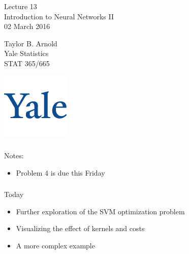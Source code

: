 \documentclass[xetex,mathserif,serif,aspectratio=169]{beamer}
\begin{document}
\begin{frame}[fragile] \frametitle{} \oldB \small

\vfill

{\fontsize{0.7cm}{0cm}\selectfont Lecture 13 \\\vspace{0.2cm} Introduction to Neural Networks II}\\\vspace{0.5cm}
02 March 2016

\vspace{2cm}

\begin{minipage}{0.6\textwidth}
Taylor B. Arnold \\
Yale Statistics \\
STAT 365/665
\end{minipage}
\hfill
\begin{minipage}{0.3\textwidth}\raggedleft
\includegraphics[scale=0.3]{../yale-logo.png}
\end{minipage}%

\end{frame}

\begin{frame}[fragile] \frametitle{} \oldB \small

Notes:
\begin{itemize}
\item Problem 4 is due this Friday
\end{itemize}

\end{frame}

\begin{frame}[fragile] \frametitle{} \oldB \small

Today
\begin{itemize}
\item Further exploration of the SVM optimization problem
\item Visualizing the effect of kernels and costs
\item A more complex example
\end{itemize}

\end{frame}
\end{document}
